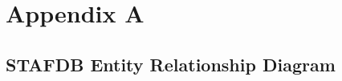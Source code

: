\documentclass[ %
                    author={Tom Jager},
                supervisor={Dr. Daniel Schien},
                    degree={MEng},
                     title={A Bayesian Inference Engine for UMIS Structured Data},
                  subtitle={},
                      type={research},
                      year={2019} ]{dissertation}
\begin{document}
\backmatter





\appendix

\chapter{Appendix A}
\label{appx:example}

\section{STAFDB Entity Relationship Diagram}

\end{document}

